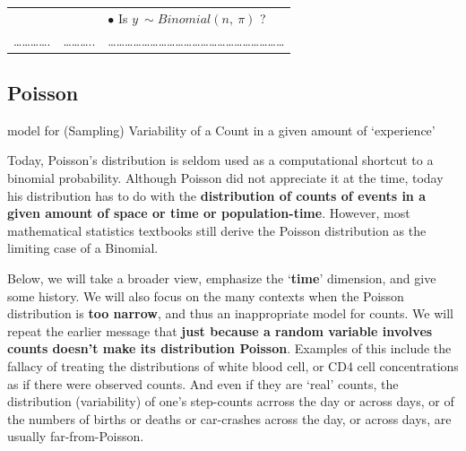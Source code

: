 \documentclass[]{book}
\begin{document}
\begin{longtable}[]{@{}lrl@{}}
\begin{minipage}[t]{0.60\columnwidth}
\strut
\end{minipage} & \begin{minipage}[t]{0.16\columnwidth}\raggedleft
\strut
\end{minipage} & \begin{minipage}[t]{0.16\columnwidth}\raggedright
\(\bullet\) Is \(y ~ \sim Binomial(n, \ \pi)\) ?\strut
\end{minipage}\tabularnewline
\begin{minipage}[t]{0.60\columnwidth}\raggedright
\ldots{}\ldots{}\ldots{}\ldots{}.\strut
\end{minipage} & \begin{minipage}[t]{0.16\columnwidth}\raggedleft
\ldots{}\ldots{}\ldots{}..\strut
\end{minipage} & \begin{minipage}[t]{0.16\columnwidth}\raggedright
\ldots{}\ldots{}\ldots{}\ldots{}\ldots{}\ldots{}\ldots{}\ldots{}\ldots{}\ldots{}\ldots{}\ldots{}\ldots{}\ldots{}\ldots{}\ldots{}\ldots{}\ldots{}\ldots{}\ldots{}\ldots{}\strut
\end{minipage}\tabularnewline
\bottomrule
\end{longtable}

\hypertarget{poisson}{%
\subsection{Poisson}\label{poisson}}

model for (Sampling) Variability of a Count in a given amount of `experience'

Today, Poisson's distribution is seldom used as a computational shortcut to a binomial probability. Although Poisson did not appreciate it at the time, today his distribution has to do with the \textbf{distribution of counts of events in a given amount of space or time or population-time}. However, most mathematical statistics textbooks still derive the Poisson distribution as the limiting case of a Binomial.

Below, we will take a broader view, emphasize the `\textbf{time}' dimension, and give some history. We will also focus on the many contexts when the Poisson distribution is \textbf{too narrow}, and thus an inappropriate model for counts. We will repeat the earlier message that \textbf{just because a random variable involves counts doesn't make its distribution Poisson}. Examples of this include the fallacy of treating the distributions of white blood cell, or CD4 cell concentrations as if there were observed counts. And even if they are `real' counts, the distribution (variability) of one's step-counts acrross the day or across days, or of the numbers of births or deaths or car-crashes across the day, or across days, are usually far-from-Poisson.
\end{document}
